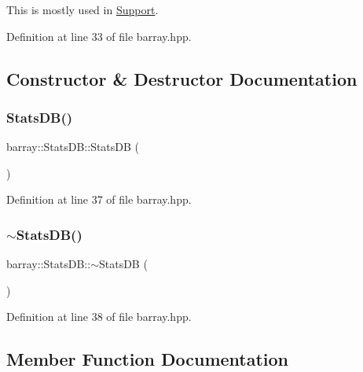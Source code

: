 This is mostly used in {\ttfamily \hyperlink{classbarray_1_1_support}{Support}}. 

Definition at line 33 of file barray.\+hpp.



\subsection{Constructor \& Destructor Documentation}
\mbox{\label{classbarray_1_1_stats_d_b_ae340e221cf709c0163a67436eb6e49dd}} 
\subsubsection{\texorpdfstring{Stats\+D\+B()}{StatsDB()}}
{\footnotesize\ttfamily barray\+::\+Stats\+D\+B\+::\+Stats\+DB (\begin{DoxyParamCaption}{ }\end{DoxyParamCaption})\hspace{0.3cm}{\ttfamily [inline]}}



Definition at line 37 of file barray.\+hpp.

\mbox{\label{classbarray_1_1_stats_d_b_a111c72722a94fbb45e6c4d495081fa7e}} 
\subsubsection{\texorpdfstring{$\sim$\+Stats\+D\+B()}{~StatsDB()}}
{\footnotesize\ttfamily barray\+::\+Stats\+D\+B\+::$\sim$\+Stats\+DB (\begin{DoxyParamCaption}{ }\end{DoxyParamCaption})\hspace{0.3cm}{\ttfamily [inline]}}



Definition at line 38 of file barray.\+hpp.



\subsection{Member Function Documentation}
\mbox{\label{classbarray_1_1_stats_d_b_a196bdb1b0a8e166d03a90aadc0e103b0}} 
